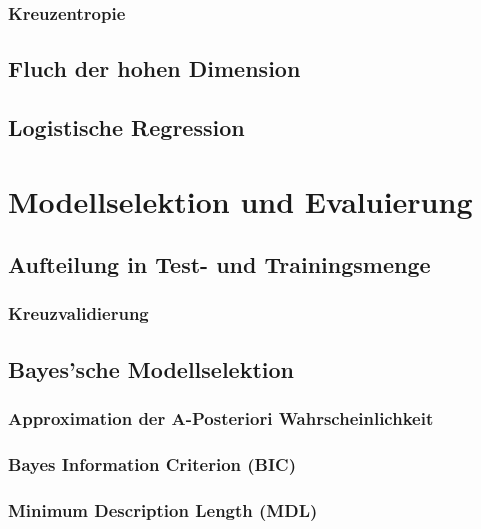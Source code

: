 		\subsection{Kreuzentropie} %

	\section{Fluch der hohen Dimension} %

	\section{Logistische Regression} %

\chapter{Modellselektion und Evaluierung} %

	\section{Aufteilung in Test- und Trainingsmenge} %

		\subsection{Kreuzvalidierung} %

	\section{Bayes'sche Modellselektion} %

		\subsection{Approximation der A-Posteriori Wahrscheinlichkeit} %

		\subsection{Bayes Information Criterion (BIC)} %

		\subsection{Minimum Description Length (MDL)} %

